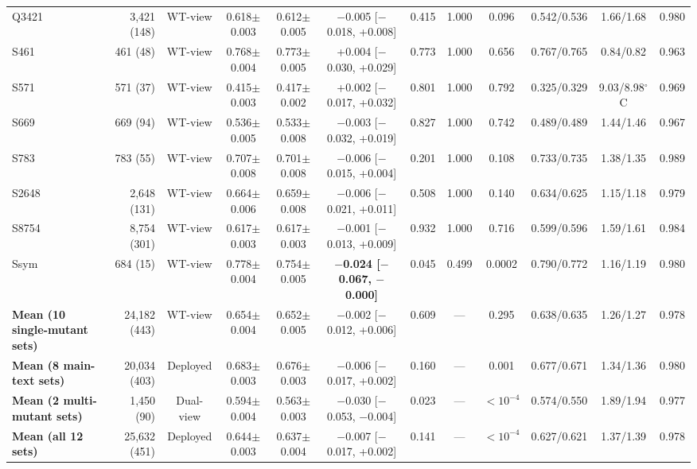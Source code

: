 \begin{table}[htbp]
\begin{tabular}{lrcccccccccc}
Q3421 & 3,421 (148) & WT-view & 0.618$\pm$0.003 & 0.612$\pm$0.005 & $-$0.005 [$-$0.018, +0.008] & 0.415 & 1.000 & 0.096 & 0.542/0.536 & 1.66/1.68 & 0.980 \\
S461 & 461 (48) & WT-view & 0.768$\pm$0.004 & 0.773$\pm$0.005 & +0.004 [$-$0.030, +0.029] & 0.773 & 1.000 & 0.656 & 0.767/0.765 & 0.84/0.82 & 0.963 \\
S571 & 571 (37) & WT-view & 0.415$\pm$0.003 & 0.417$\pm$0.002 & +0.002 [$-$0.017, +0.032] & 0.801 & 1.000 & 0.792 & 0.325/0.329 & 9.03/8.98$^\circ$C & 0.969 \\
S669 & 669 (94) & WT-view & 0.536$\pm$0.005 & 0.533$\pm$0.008 & $-$0.003 [$-$0.032, +0.019] & 0.827 & 1.000 & 0.742 & 0.489/0.489 & 1.44/1.46 & 0.967 \\
S783 & 783 (55) & WT-view & 0.707$\pm$0.008 & 0.701$\pm$0.008 & $-$0.006 [$-$0.015, +0.004] & 0.201 & 1.000 & 0.108 & 0.733/0.735 & 1.38/1.35 & 0.989 \\
S2648 & 2,648 (131) & WT-view & 0.664$\pm$0.006 & 0.659$\pm$0.008 & $-$0.006 [$-$0.021, +0.011] & 0.508 & 1.000 & 0.140 & 0.634/0.625 & 1.15/1.18 & 0.979 \\
S8754 & 8,754 (301) & WT-view & 0.617$\pm$0.003 & 0.617$\pm$0.003 & $-$0.001 [$-$0.013, +0.009] & 0.932 & 1.000 & 0.716 & 0.599/0.596 & 1.59/1.61 & 0.984 \\
Ssym & 684 (15) & WT-view & 0.778$\pm$0.004 & 0.754$\pm$0.005 & \textbf{$-$0.024 [$-$0.067, $-$0.000]} & 0.045 & 0.499 & 0.0002 & 0.790/0.772 & 1.16/1.19 & 0.980 \\
\midrule
\textbf{Mean (10 single-mutant sets)} & 24,182 (443) & WT-view & 0.654$\pm$0.004 & 0.652$\pm$0.005 & $-$0.002 [$-$0.012, +0.006] & 0.609 & --- & 0.295 & 0.638/0.635 & 1.26/1.27 & 0.978 \\
\textbf{Mean (8 main-text sets)} & 20,034 (403) & Deployed & 0.683$\pm$0.003 & 0.676$\pm$0.003 & $-$0.006 [$-$0.017, +0.002] & 0.160 & --- & 0.001 & 0.677/0.671 & 1.34/1.36 & 0.980 \\
\textbf{Mean (2 multi-mutant sets)} & 1,450 (90) & Dual-view & 0.594$\pm$0.004 & 0.563$\pm$0.003 & $-$0.030 [$-$0.053, $-$0.004] & 0.023 & --- & $<10^{-4}$ & 0.574/0.550 & 1.89/1.94 & 0.977 \\
\textbf{Mean (all 12 sets)} & 25,632 (451) & Deployed & 0.644$\pm$0.003 & 0.637$\pm$0.004 & $-$0.007 [$-$0.017, +0.002] & 0.141 & --- & $<10^{-4}$ & 0.627/0.621 & 1.37/1.39 & 0.978 \\
\bottomrule
\end{tabular}
\end{table}
